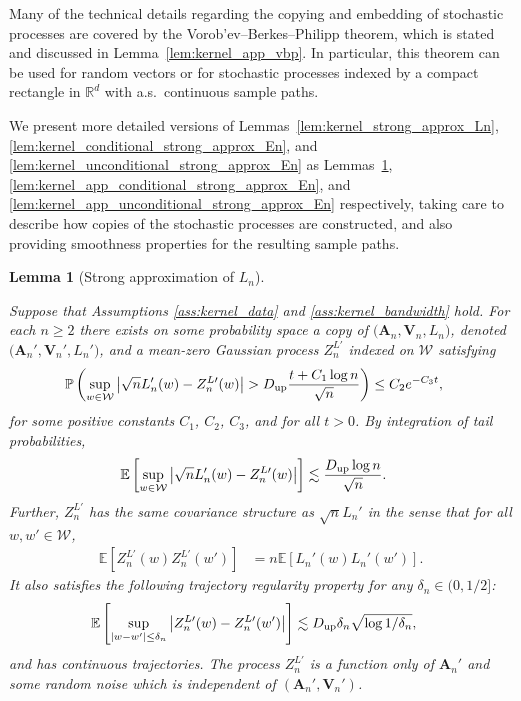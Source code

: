 \documentclass[11pt,lof]{puthesis}
\renewcommand{\P}{\ensuremath{\mathbb{P}}}
\newcommand{\R}{\ensuremath{\mathbb{R}}}
\newcommand{\E}{\ensuremath{\mathbb{E}}}
\newcommand{\bA}{\ensuremath{\mathbf{A}}}
\newcommand{\bV}{\ensuremath{\mathbf{V}}}
\newcommand{\cW}{\ensuremath{\mathcal{W}}}
\newcommand{\Du}{\ensuremath{D_{\textup{up}}}}
\theoremstyle{break}
\newtheorem{lemma}{Lemma}[section]
\theoremstyle{proof}
\begin{document}
Many of the technical details regarding
the copying and embedding of stochastic processes
are covered by the
Vorob'ev--Berkes--Philipp theorem,
which is stated and discussed in
Lemma~\ref{lem:kernel_app_vbp}.
In particular, this theorem can be used
for random vectors or for stochastic processes
indexed by a compact rectangle in $\R^d$
with a.s.\ continuous sample paths.

We present more detailed versions of
Lemmas~\ref{lem:kernel_strong_approx_Ln},
\ref{lem:kernel_conditional_strong_approx_En},
and \ref{lem:kernel_unconditional_strong_approx_En}
as Lemmas~\ref{lem:kernel_app_strong_approx_Ln},
\ref{lem:kernel_app_conditional_strong_approx_En},
and \ref{lem:kernel_app_unconditional_strong_approx_En}
respectively, taking care to describe how copies of
the stochastic processes are constructed,
and also providing smoothness properties for
the resulting sample paths.

\begin{lemma}[Strong approximation of $L_n$]
\label{lem:kernel_app_strong_approx_Ln}

Suppose that Assumptions
\ref{ass:kernel_data}
and
\ref{ass:kernel_bandwidth} hold.
For each $n \geq 2$
there exists
on some probability space
a copy of $\big(\bA_n, \bV_n, L_n\big)$,
denoted $\big(\bA_n', \bV_n', L_n'\big)$,
and a mean-zero Gaussian process
$Z^{L\prime}_n$
indexed on $\cW$ satisfying
%
\begin{align*}
\P\left(
\sup_{w \in \cW}
\big| \sqrt{n} L'_n(w) - Z_n^{L\prime}(w)\big|
> \Du
\frac{t + C_1 \log n}{\sqrt{n}}
\right)
&\leq C_2 e^{-C_3 t},
\end{align*}
%
for some positive constants
$C_1$, $C_2$, $C_3$,
and for all $t > 0$.
By integration of tail probabilities,
%
\begin{align*}
\E\left[
\sup_{w \in \cW}
\big| \sqrt{n} L_n'(w) - Z_n^{L\prime}(w)\big|
\right]
&\lesssim
\frac{\Du \log n}{\sqrt{n}}.
\end{align*}
%
Further,
$Z_n^{L\prime}$ has the same covariance structure as
$\sqrt{n} L_n'$ in the sense that for all $w, w' \in \cW$,
%
\begin{align*}
\E\left[
Z_n^{L\prime}(w)
Z_n^{L\prime}(w')
\right]
&=
n
\E\left[
L_n'(w)
L_n'(w')
\right].
\end{align*}
%
It also satisfies the following
trajectory regularity property
for any $\delta_n \in (0, 1/2]$:
%
\begin{align*}
\E\left[
\sup_{|w-w'| \leq \delta_n}
\big|
Z_n^{L\prime}(w)
- Z_n^{L\prime}(w')
\big|
\right]
&\lesssim
\Du
\delta_n \sqrt{\log 1/\delta_n},
\end{align*}
%
and has continuous trajectories.
The process $Z_n^{L\prime}$
is a function only of $\bA_n'$
and some random noise
which is independent of $(\bA_n', \bV_n')$.

\end{lemma}
\end{document}
